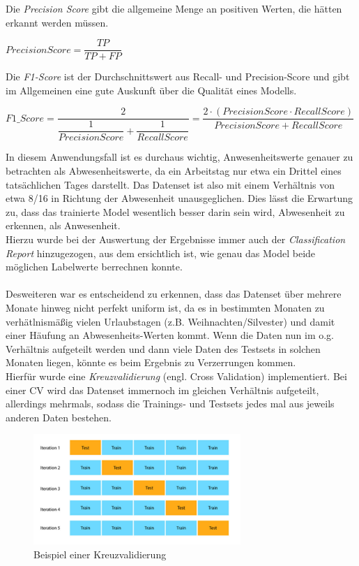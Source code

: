 Die \textit{Precision Score} gibt die allgemeine Menge an positiven Werten, die hätten erkannt werden müssen.
\begin{center}
    $PrecisionScore = \dfrac{TP}{TP + FP}$    
\end{center}

Die \textit{F1-Score} ist der Durchschnittswert aus Recall- und Precision-Score und gibt im Allgemeinen eine 
gute Auskunft über die Qualität eines Modells.\\

\begin{center}
    $F1\_Score = \dfrac{2}{\dfrac{1}{PrecisionScore} + \dfrac{1}{RecallScore}} = \dfrac{2 \cdot (PrecisionScore \cdot RecallScore)}{PrecisionScore + RecallScore}$    
\end{center}

\vspace{0.75cm}
In diesem Anwendungsfall ist es durchaus wichtig, Anwesenheitswerte genauer zu betrachten als 
Abwesenheitswerte, da ein Arbeitstag nur etwa ein Drittel eines tatsächlichen Tages darstellt. 
Das Datenset ist also mit einem Verhältnis von etwa 8/16 in Richtung der Abwesenheit unausgeglichen. Dies 
lässt die Erwartung zu, dass das trainierte Model wesentlich besser darin sein wird, Abwesenheit zu erkennen,
als Anwesenheit.\\
Hierzu wurde bei der Auswertung der Ergebnisse immer auch der \textit{Classification Report} hinzugezogen,
aus dem ersichtlich ist, wie genau das Model beide möglichen Labelwerte berrechnen konnte.\\\\
Desweiteren war es entscheidend zu erkennen, dass das Datenset über mehrere Monate hinweg nicht perfekt uniform 
ist, da es in bestimmten Monaten zu verhätlnismäßig vielen Urlaubstagen (z.B. Weihnachten/Silvester) und damit 
einer Häufung an Abwesenheits-Werten kommt.
Wenn die Daten nun im o.g. Verhältnis aufgeteilt werden und dann viele Daten des Testsets in solchen Monaten 
liegen, könnte es beim Ergebnis zu Verzerrungen kommen.\\
Hierfür wurde eine \textit{Kreuzvalidierung} (engl. Cross Validation) implementiert. Bei einer CV wird das 
Datenset immernoch im gleichen Verhältnis aufgeteilt, allerdings mehrmals, sodass die Trainings- und Testsets 
jedes mal aus jeweils anderen Daten bestehen.

\begin{figure}[h]
    \centering
    \includegraphics[width=0.7\textwidth]{pic/CV.png}
    \caption{Beispiel einer Kreuzvalidierung}
    \label{fig:CV}
\end{figure}


